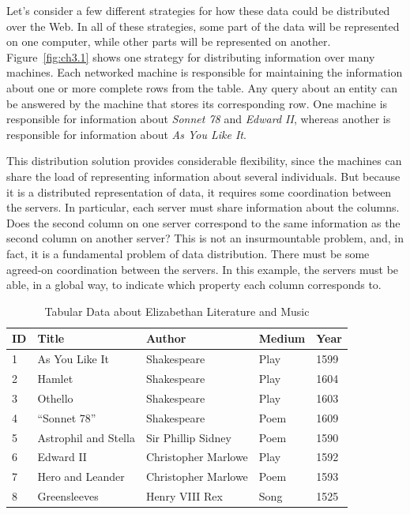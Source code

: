 Let's consider a few different strategies for how these data could be
distributed over the Web. In all of these strategies, some part of the
data will be represented on one computer, while other parts will be
represented on another. Figure~\ref{fig:ch3.1} shows one strategy for distributing
information over many machines. Each networked machine is responsible
for maintaining the information about one or more complete rows from the
table. Any query about an entity can be answered by the machine that
stores its corresponding row. One machine is responsible for information
about \emph{Sonnet 78} and \emph{Edward II}, whereas another is
responsible for information about \emph{As You Like It}.

This distribution solution provides considerable flexibility, since the
machines can share the load of representing information about several
individuals. But because it is a distributed representation of data, it
requires some coordination between the servers. In particular, each
server must share information about the columns. Does the second column
on one server correspond to the same information as the second column on
another server? This is not an insurmountable problem, and, in fact, it
is a fundamental problem of data distribution. There must be some
agreed-on coordination between the servers. In this example, the servers
must be able, in a global way, to indicate which property each column
corresponds to.

\begin{table}[h]
\centering
\begin{tabular}{||l l l l l||} 
 \hline
 ID & Title & Author & Medium & Year \\ [0.5ex] 
 \hline\hline
1&As You Like It&Shakespeare&Play&1599\\
2&Hamlet&Shakespeare&Play&1604\\
3&Othello&Shakespeare&Play&1603\\
4&``Sonnet 78''&Shakespeare&Poem&1609\\
5&Astrophil and Stella&Sir Phillip Sidney&Poem&1590\\
6&Edward II&Christopher Marlowe&Play&1592\\
7&Hero and Leander&Christopher Marlowe&Poem&1593\\
8&Greensleeves&Henry VIII Rex&Song&1525\\
\hline
\end{tabular}
\caption{Tabular Data about Elizabethan Literature and Music}
\label{tab:ch3.1}
\end{table}


